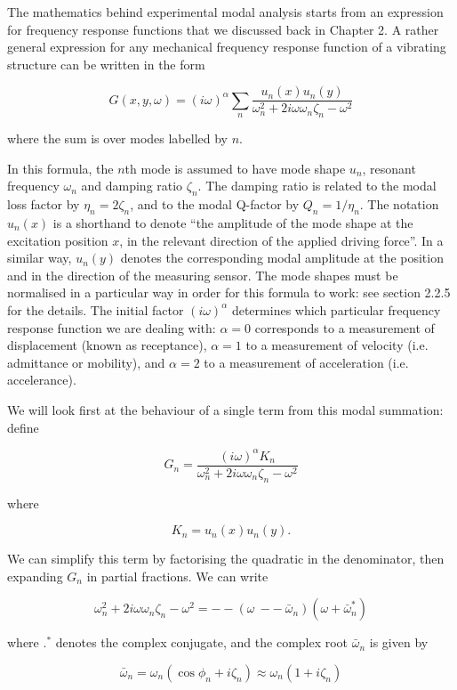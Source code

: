   The mathematics behind experimental modal analysis starts from an expression 
  for frequency response functions that we discussed back in Chapter 2. A 
  rather general expression for any mechanical frequency response function of a 
  vibrating structure can be written in the form 

  $$G(x,y,\omega) = (i \omega)^\alpha \sum_n \dfrac{u_n(x) 
  u_n(y)}{\omega_n^2+2i\omega \omega_n \zeta_n-\omega^2} \tag{1}$$ 

  where the sum is over modes labelled by $n$. 

  In this formula, the $n$th mode is assumed to have mode shape $u_n$, resonant 
  frequency $\omega_n$ and damping ratio $\zeta_n$. The damping ratio is 
  related to the modal loss factor by $\eta_n = 2 \zeta_n$, and to the modal 
  Q-factor by $Q_n=1/\eta_n$. The notation $u_n(x)$ is a shorthand to denote 
  ``the amplitude of the mode shape at the excitation position $x$, in the 
  relevant direction of the applied driving force''. In a similar way, $u_n(y)$ 
  denotes the corresponding modal amplitude at the position and in the 
  direction of the measuring sensor. The mode shapes must be normalised in a 
  particular way in order for this formula to work: see section 2.2.5 for the 
  details. The initial factor $(i \omega)^\alpha$ determines which particular 
  frequency response function we are dealing with: $\alpha=0$ corresponds to a 
  measurement of displacement (known as receptance), $\alpha=1$ to a 
  measurement of velocity (i.e. admittance or mobility), and $\alpha=2$ to a 
  measurement of acceleration (i.e. accelerance). 

  We will look first at the behaviour of a single term from this modal 
  summation: define 

  $$G_n = \dfrac{(i \omega)^\alpha K_n}{\omega_n^2+2i\omega \omega_n 
  \zeta_n-\omega^2} \tag{2}$$ 

  where 

  $$K_n= u_n(x) u_n(y) . \tag{3}$$ 

  We can simplify this term by factorising the quadratic in the denominator, 
  then expanding $G_n$ in partial fractions. We can write 

  $$\omega_n^2+2i\omega \omega_n \zeta_n-\omega^2 = -- (\omega \mathrm{~} -- 
  \mathrm{~} \bar{\omega}_n)(\omega + \bar{\omega}^*_n) \tag{4}$$ 

  where $.^*$ denotes the complex conjugate, and the complex root 
  $\bar{\omega}_n$ is given by 

  $$\bar{\omega}_n=\omega_n (\cos \phi_n + i \zeta_n) \approx \omega_n (1 + i 
  \zeta_n) \tag{5}$$ 

